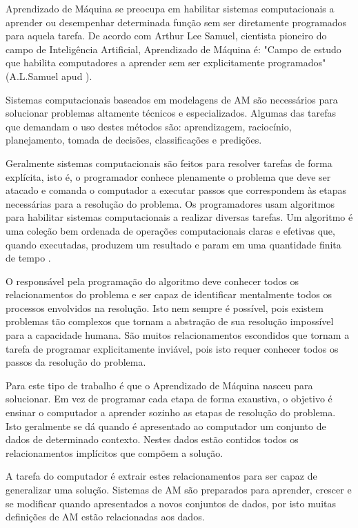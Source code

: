 Aprendizado de Máquina se preocupa em habilitar sistemas computacionais a aprender ou desempenhar determinada função sem ser diretamente programados para aquela tarefa. De acordo com Arthur Lee Samuel, cientista pioneiro do campo de Inteligência Artificial, Aprendizado de Máquina é: "Campo de estudo que habilita computadores a aprender sem ser explicitamente programados" (A.L.Samuel apud ).

Sistemas computacionais baseados em modelagens de AM são necessários para solucionar problemas altamente técnicos e especializados. Algumas das tarefas que demandam o uso destes métodos são: aprendizagem, raciocínio, planejamento, tomada de decisões, classificações e predições. 

Geralmente sistemas computacionais são feitos para resolver tarefas de forma explícita, isto é, o programador conhece plenamente o problema que deve ser atacado e comanda o computador a executar passos que correspondem às etapas necessárias para a resolução do problema.
Os programadores usam algoritmos para habilitar sistemas computacionais a realizar diversas tarefas. Um algoritmo é uma coleção bem ordenada de operações computacionais claras e efetivas que, quando executadas, produzem um resultado e param em uma quantidade finita de tempo \cite{schn1995}. 

O responsável pela programação do algoritmo deve conhecer todos os relacionamentos do problema e ser capaz de identificar mentalmente todos os processos envolvidos na resolução. Isto nem sempre é possível, pois existem problemas tão complexos que tornam a abstração de sua resolução impossível para a capacidade humana. São muitos relacionamentos escondidos que tornam a tarefa de programar explicitamente inviável, pois isto requer conhecer todos os passos da resolução do problema.

Para este tipo de trabalho é que o Aprendizado de Máquina nasceu para solucionar. Em vez de programar cada etapa de forma exaustiva, o objetivo é ensinar o computador a aprender sozinho as etapas de resolução do problema. Isto geralmente se dá quando é apresentado ao computador um conjunto de dados de determinado contexto. Nestes dados estão contidos todos os relacionamentos implícitos que compõem a solução. 

A tarefa do computador é extrair estes relacionamentos para ser capaz de generalizar uma solução. Sistemas de AM são preparados para aprender, crescer e se modificar quando apresentados a novos conjuntos de dados, por isto muitas definições de AM estão relacionadas aos dados.

